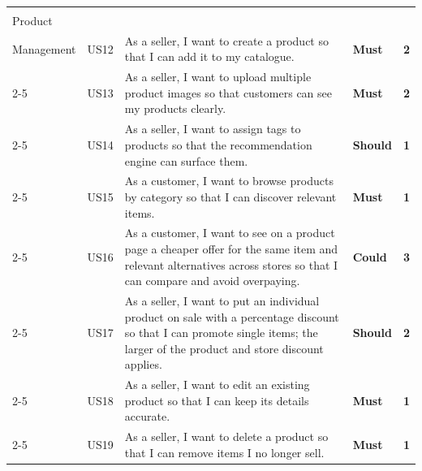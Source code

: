 \begin{longtable}{|>{\centering\arraybackslash\small}p{2.2cm}|>{\centering\arraybackslash\small}p{0.9cm}|>{\small}p{7.4cm}|>{\centering\arraybackslash\small}p{1.3cm}|>{\centering\arraybackslash\small}p{0.6cm}|}
  \cellcolor{featProduct}\makecell[c]{\textbf{F3}\\\small Product\\Management}
  & US12 & As a seller, I want to create a product so that I can add it to my catalogue. & \cellcolor{moscowMust}\textbf{Must} & \cellcolor{complexMed}\textbf{2} \\\cline{2-5}
  \cellcolor{featProduct} & US13 & As a seller, I want to upload multiple product images so that customers can see my products clearly. & \cellcolor{moscowMust}\textbf{Must} & \cellcolor{complexMed}\textbf{2} \\\cline{2-5}
  \cellcolor{featProduct} & US14 & As a seller, I want to assign tags to products so that the recommendation engine can surface them. & \cellcolor{moscowShould}\textbf{Should} & \cellcolor{complexLow}\textbf{1} \\\cline{2-5}
  \cellcolor{featProduct} & US15 & As a customer, I want to browse products by category so that I can discover relevant items. & \cellcolor{moscowMust}\textbf{Must} & \cellcolor{complexLow}\textbf{1} \\\cline{2-5}
  \cellcolor{featProduct} & US16 & As a customer, I want to see on a product page a cheaper offer for the same item and relevant alternatives across stores so that I can compare and avoid overpaying. & \cellcolor{moscowCould}\textbf{Could} & \cellcolor{complexHigh}\textbf{3} \\\cline{2-5}
  \cellcolor{featProduct} & US17 & As a seller, I want to put an individual product on sale with a percentage discount so that I can promote single items; the larger of the product and store discount applies. & \cellcolor{moscowShould}\textbf{Should} & \cellcolor{complexMed}\textbf{2} \\\cline{2-5}
  \cellcolor{featProduct} & US18 & As a seller, I want to edit an existing product so that I can keep its details accurate. & \cellcolor{moscowMust}\textbf{Must} & \cellcolor{complexLow}\textbf{1} \\\cline{2-5}
  \cellcolor{featProduct} & US19 & As a seller, I want to delete a product so that I can remove items I no longer sell. & \cellcolor{moscowMust}\textbf{Must} & \cellcolor{complexLow}\textbf{1} \\\hline


\end{longtable}
